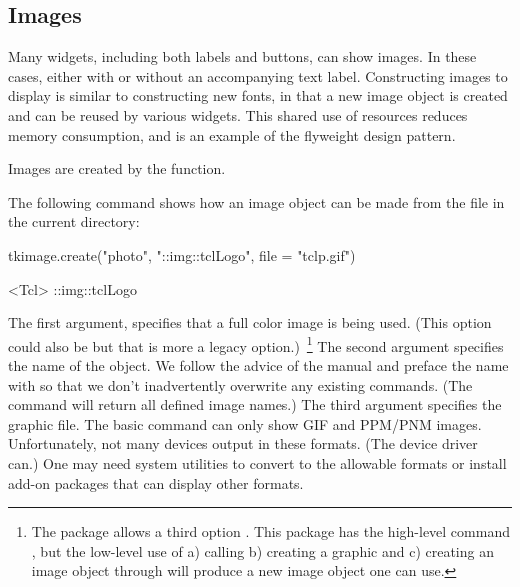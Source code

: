 \subsection{Images}
\label{sec:tcltk:overview:images}


Many  widgets, including both labels and buttons, can show
images. In these cases, either with or without an accompanying text
label. Constructing images to display is similar to constructing new
fonts, in that a new image object is created and can be reused by
various widgets. This shared use of resources reduces memory
consumption, and is an example of the flyweight design pattern.

Images are created by the  function.

The following command shows how an image object can be made from the
file  in the current directory:

\begin{Schunk}
\begin{Sinput}
 tkimage.create("photo", "::img::tclLogo", file = "tclp.gif")
\end{Sinput}
\begin{Soutput}
<Tcl> ::img::tclLogo 
\end{Soutput}
\end{Schunk}


The first argument,  specifies that a full color image is
being used. (This option could also be  but that is more
a legacy option.)~\footnote{The  package allows a third
  option . This package has the high-level command
  , but the low-level use of a) calling
   b) creating a graphic and c) creating an image
  object through  will
  produce a new image object one can use.} The second argument
specifies the name of the object. We follow the advice of the \TK\/
manual and preface the name with  so that we don't
inadvertently overwrite any existing \TCL\/ commands. (The command
 will return all defined image names.) The
third argument  specifies the graphic
file. The basic \TK\/  command can only show GIF and
PPM/PNM images. Unfortunately, not many \R\/ devices output in these
formats. (The  device driver can.) One may need system
utilities to convert to the allowable formats or install add-on \TCL\/
packages that can display other formats.~

